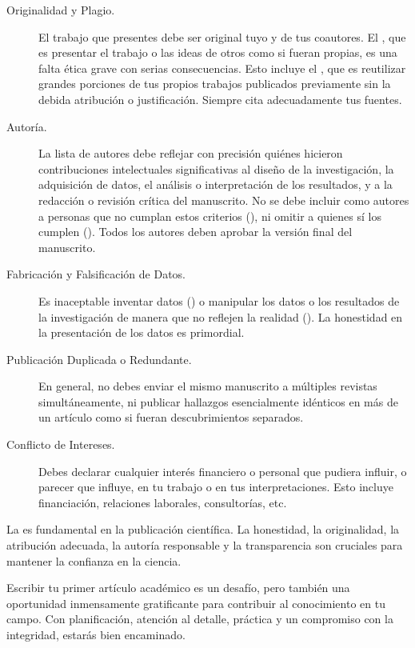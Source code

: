 \begin{description}
  \item[Originalidad y Plagio.] El trabajo que presentes debe ser original
    tuyo y de tus coautores.
    El , que es presentar el trabajo o las ideas de
    otros como si fueran propias, es una falta ética grave con serias
    consecuencias.
    Esto incluye el , que es reutilizar grandes
    porciones de tus propios trabajos publicados previamente sin la debida
    atribución o justificación.
    Siempre cita adecuadamente tus fuentes.

  \item[Autoría.] La lista de autores debe reflejar con precisión quiénes
    hicieron contribuciones intelectuales significativas al diseño de la
    investigación, la adquisición de datos, el análisis o interpretación de
    los resultados, y a la redacción o revisión crítica del manuscrito.
    No se debe incluir como autores a personas que no cumplan estos
    criterios (),
    ni omitir a quienes sí los cumplen ().
    Todos los autores deben aprobar la versión final del manuscrito.

  \item[Fabricación y Falsificación de Datos.] Es inaceptable inventar datos
    () o manipular los datos o los resultados de
    la investigación de manera que no reflejen la realidad
    ().
    La honestidad en la presentación de los datos es primordial.

  \item[Publicación Duplicada o Redundante.] En general, no debes enviar el
    mismo manuscrito a múltiples revistas simultáneamente, ni publicar
    hallazgos esencialmente idénticos en más de un artículo como si fueran
    descubrimientos separados.

  \item[Conflicto de Intereses.] Debes declarar cualquier interés financiero o
    personal que pudiera influir, o parecer que influye, en tu trabajo o en
    tus interpretaciones.
    Esto incluye financiación, relaciones laborales, consultorías, etc.
\end{description}

\begin{remember}
  \label{rem:eticaarticulo}
  La  es fundamental en la
  publicación científica.
  La honestidad, la originalidad, la atribución adecuada, la autoría
  responsable y la transparencia son cruciales para mantener la confianza en
  la ciencia.
\end{remember}

Escribir tu primer artículo académico es un desafío, pero también una oportunidad
inmensamente gratificante para contribuir al conocimiento en tu campo.
Con planificación, atención al detalle, práctica y un compromiso con la
integridad, estarás bien encaminado.
